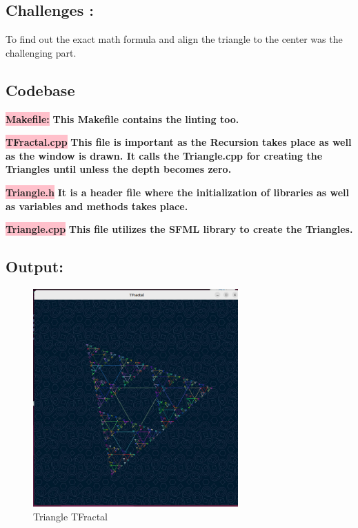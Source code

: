 \subsection{Challenges :}\label{sec:ps2:challenges}

To find out the exact math formula and align the triangle to the center was the challenging part.
\newpage
\subsection{Codebase}\label{sec:ps2:code}

\colorbox{pink}{\textbf{Makefile:}} \newline \textbf{This Makefile contains the linting too.}


\colorbox{pink}{\textbf{TFractal.cpp}} \newline \textbf{This file is important as the Recursion takes place as well as the window is drawn. It calls the Triangle.cpp for creating the Triangles until unless the depth becomes zero.}


\colorbox{pink}{\textbf{Triangle.h}} \newline \textbf{It is a header file where the initialization of libraries as well as variables and methods takes place.}


\newpage

\colorbox{pink}{\textbf{Triangle.cpp}} \newline \textbf{This file utilizes the SFML library to create the Triangles.}






\subsection{Output:}\label{sec:ps2:output}
\begin{figure}[h]
    \centering
    \includegraphics[width=0.7\textwidth]{ps2/screenshot.png}
    \caption{Triangle TFractal}
    \label{fig:tri}
\end{figure}

\newpage
